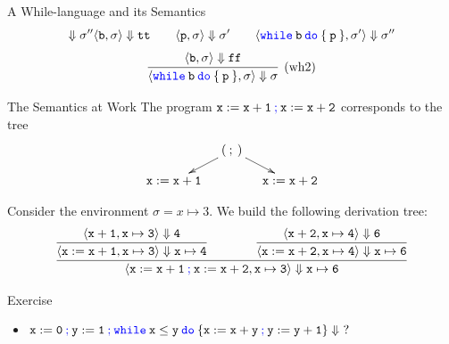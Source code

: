 \documentclass{beamer}
\newcommand{\blue}[1]{\textcolor{blue}{#1}}
\begin{document}
\begin{frame}{A While-language and its Semantics}
\[{                        \Downarrow \sigma''
                }{
                        \langle \mathtt{b}, \sigma \rangle \Downarrow \mathtt{tt} \qquad
                        \langle \mathtt{p}, \sigma \rangle \Downarrow \sigma' \qquad
                        \langle \mathtt{\blue{while} \> b \> \blue{do} \> \{ \> p \> \}}, \sigma'
                        \rangle \Downarrow \sigma'' 
                }
        \]\vspace{0.001cm}
        \[
                \infer[(\text{wh2})]{
                        \langle \mathtt{\blue{while} \> b \> \blue{do} \> \{ \> p \> \}}, \sigma \rangle
                        \Downarrow \sigma
                }{
                        \langle \mathtt{b}, \sigma \rangle \Downarrow \mathtt{ff}
                }
        \]
\end{frame}
\begin{frame}{The Semantics at Work}
        The program $\mathtt{x := x + 1 \> \blue{;} \> x := x + 2}$ corresponds to the tree 
        \[
                \xymatrix@C=10pt@R=10pt{
                        & (\> ; \>) \ar[dl] \ar[dr]  & \\
                        \mathtt{x := x + 1} & & \mathtt{x := x + 2} 
                }
        \]

        Consider the environment $\sigma = x \mapsto 3$. 
        We build the following derivation tree: 
        \[
                \infer{
                        \langle \mathtt{ x := x + 1 \> \blue{;} \> x := x + 2 }, \mathtt{x \mapsto 3}
                        \rangle \Downarrow \mathtt{x \mapsto 6}
                }{
                        \infer{
                                \langle \mathtt{x := x +1}, \mathtt{x \mapsto 3} \rangle 
                                \Downarrow \mathtt{x \mapsto 4}
                        }{
                                \langle \mathtt{x + 1}, \mathtt{x \mapsto 3} \rangle \Downarrow
                                \mathtt{4}
                        }\qquad \qquad                        
                        \infer{
                                \langle \mathtt{x := x + 2}, \mathtt{x \mapsto 4} \rangle 
                                \Downarrow \mathtt{x \mapsto 6}
                        }{
                                \langle \mathtt{x + 2}, \mathtt{x \mapsto 4} \rangle \Downarrow
                                \mathtt{6}
                        }
                }
        \]
\end{frame}

\begin{frame}{Exercise}
        \begin{itemize}
                \item $\mathtt{x := 0 \> \blue{;} \> y := 1 \> \blue{;} \> 
                                \blue{while} \> x \leq y \> \blue{do} \> \{ x : = x + y \> \blue{;} \>
                        y := y + 1 \}} \Downarrow\ ?$
        \end{itemize}
\end{frame}
\end{document}
